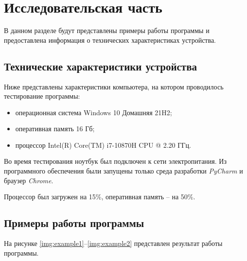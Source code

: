 \chapter{Исследовательская часть}

В данном разделе будут представлены примеры работы программы и предоставлена информация о технических характеристиках устройства.

\section{Технические характеристики устройства}

Ниже представлены характеристики компьютера, на котором проводилось тестирование программы:
\begin{itemize}[label=---]
    \item операционная система Windows 10 Домашняя 21H2;
    \item оперативная память 16 Гб;
    \item процессор Intel(R) Core(TM) i7-10870H CPU @ 2.20 ГГц.
\end{itemize}

Во время тестирования ноутбук был подключен к сети электропитания. Из программного обеспечения были запущены только среда разработки \textit{PyCharm} и браузер \textit{Chrome}.

Процессор был загружен на 15\%, оперативная память -- на 50\%.

\section{Примеры работы программы}

На рисунке \ref{img:example1}--\ref{img:example2} представлен результат работы программы.

\clearpage

